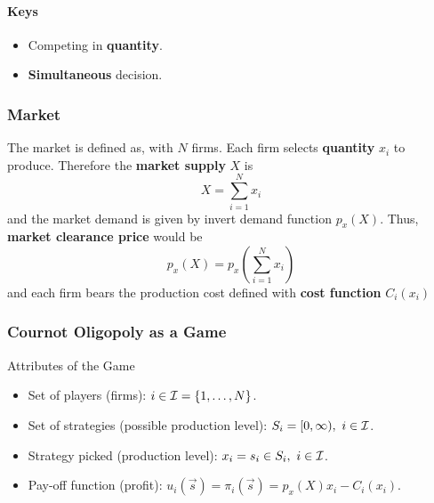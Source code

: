 \documentclass[]{article}
\begin{document}
            \paragraph{Keys}
                \begin{itemize}
                    \item Competing in \textbf{quantity}.
                    \item \textbf{Simultaneous} decision.
                \end{itemize}
                
            \subsubsection{Market}
                \begin{definition}
                    The market is defined as, with $N$ firms. Each firm selects \textbf{quantity} $x_i$ to produce. Therefore the \textbf{market supply} $X$ is 
                    \[
                        X = \sum_{i=1}^N{x_i}
                    \]
                    and the market demand is given by invert demand function $p_x(X)$. Thus, \textbf{market clearance price} would be 
                    \[
                        p_x(X) = p_x(\sum_{i=1}^N{x_i})
                    \]
                    and each firm bears the production cost defined with \textbf{cost function} $C_i(x_i)$
                \end{definition}
                
            \subsubsection{Cournot Oligopoly as a Game}
                \begin{remark} Attributes of the Game
                    \begin{itemize}
                        \item Set of players (firms): $i \in \mathcal{{I}} = \{1,\dots,N\}$.
                        \item Set of strategies (possible production level): $S_i = [0, \infty),\ i \in \mathcal{{I}}$.
                        \item Strategy picked (production level): $x_i = s_i \in S_i,\ i \in \mathcal{{I}}$.
                        \item Pay-off function (profit): $u_i(\vec{s}) = \pi_i(\vec{s}) = p_x(X)x_i - C_i(x_i)$.
                    \end{itemize}
                \end{remark}
            
\end{document}
